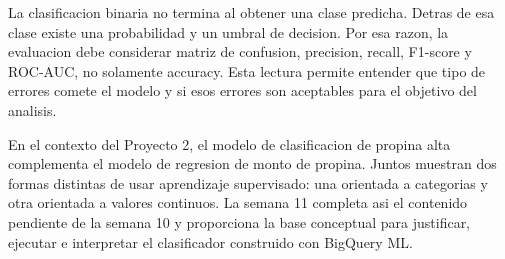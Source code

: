 \documentclass[12pt]{article}
\begin{document}
La clasificacion binaria no termina al obtener una clase predicha. Detras de esa clase existe una probabilidad y un umbral de decision. Por esa razon, la evaluacion debe considerar matriz de confusion, precision, recall, F1-score y ROC-AUC, no solamente accuracy. Esta lectura permite entender que tipo de errores comete el modelo y si esos errores son aceptables para el objetivo del analisis.

En el contexto del Proyecto 2, el modelo de clasificacion de propina alta complementa el modelo de regresion de monto de propina. Juntos muestran dos formas distintas de usar aprendizaje supervisado: una orientada a categorias y otra orientada a valores continuos. La semana 11 completa asi el contenido pendiente de la semana 10 y proporciona la base conceptual para justificar, ejecutar e interpretar el clasificador construido con BigQuery ML.

\newpage
\printbibliography
\end{document}
